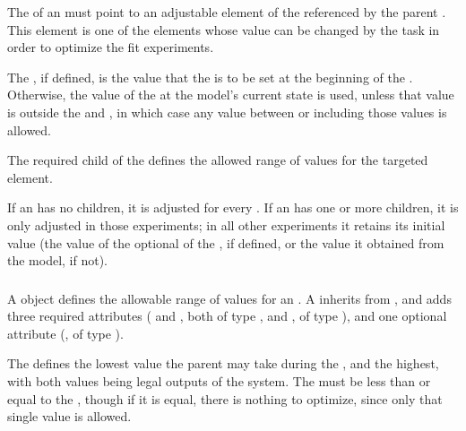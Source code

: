 The  of an \AdjustableParameter must point to an adjustable element of the \Model referenced by the parent \ParameterEstimationTask.  This element is one of the elements whose value can be changed by the task in order to optimize the fit experiments.


The , if defined, is the value that the \AdjustableParameter is to be set at the beginning of the \ParameterEstimationTask.  Otherwise, the value of the \AdjustableParameter at the model's current state is used, unless that value is outside the  and , in which case any value between or including those values is allowed.

The required \Bounds child of the \AdjustableParameter defines the allowed range of values for the targeted element.

If an \AdjustableParameter has no \ExperimentReference children, it is adjusted for every \FitExperiment.  If an \AdjustableParameter has one or more \ExperimentReference children, it is only adjusted in those experiments; in all other experiments it retains its initial value (the value of the optional  of the \AdjustableParameter, if defined, or the value it obtained from the model, if not).

\subsubsection{}
\label{class:bounds}

A \Bounds object defines the allowable range of values for an \AdjustableParameter.  A \Bounds inherits from \SedBase, and adds three required attributes ( and , both of type , and , of type \ScaleType), and one optional attribute (, of type ).

The  defines the lowest value the parent \AdjustableParameter may take during the \ParameterEstimationTask, and  the highest, with both values being legal outputs of the system.  The  must be less than or equal to the , though if it is equal, there is nothing to optimize, since only that single value is allowed.


